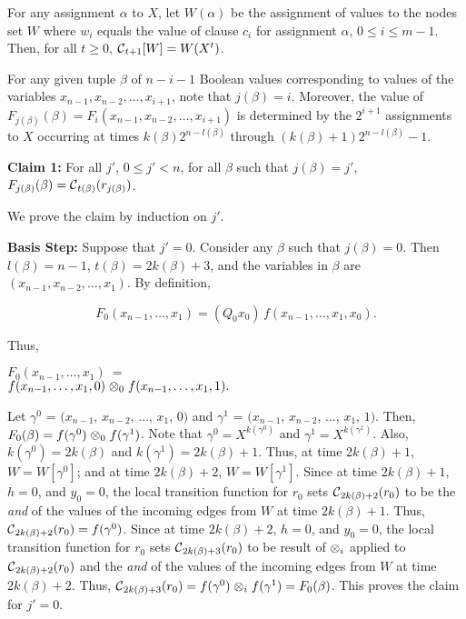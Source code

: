 For any assignment $\alpha$ to $X$, 
let $W(\alpha)$ be the assignment of values to the nodes set $W$ 
where $w_i$ equals the value of clause $c_i$ for assignment $\alpha$, $ 0 \leq i \leq m-1$.
Then,  for all $t \geq 0$, $\mbox{$\mathcal{C}$}_{t+1}[W] = W(X^t)$.

For any given tuple $\beta$ of  $n-i-1$ Boolean values 
corresponding to values of the variables $x_{n-1}, x_{n-2}, \ldots , x_{i+1}$,
note that $j(\beta) = i$.
Moreover, the value of $F_{j(\beta)}(\beta) = F_i(x_{n-1}, x_{n-2}, \ldots , x_{i+1})$
is determined by the $2^{i+1}$ assignments to $X$  occurring at times 
$k(\beta) 2^{n-l(\beta)}$ through $(k(\beta)+1) 2^{n-l(\beta)}-1$.

\smallskip
\noindent
{\bf Claim 1:} For all $j'$, $0 \leq j' < n$,
for all $\beta$ such that $j(\beta) = j'$,
$F_{j(\beta)}(\beta) =\mbox{$\mathcal{C}$}_{t(\beta)}(r_{j(\beta)})$.

\smallskip

\noindent
We prove the claim by induction on $j'$.

\smallskip
\noindent
{\bf Basis Step:} Suppose that $j' = 0$.
Consider any $\beta$ such that $j(\beta) = 0$.
Then $l(\beta) = n-1$, $t(\beta) = 2k(\beta) + 3$,
and the variables in $\beta$ are $(x_{n-1}, x_{n-2}, \ldots , x_1)$.
By definition,

\[F_0(x_{n-1}, \ldots, x_1) 
= (Q_0 x_0) \, f(x_{n-1}, \ldots , x_1, x_0).
\]

Thus,\\ \smallskip

\noindent
$F_0(x_{n-1}, \ldots, x_1) ~=~$ \\
\hspace*{0.1in}
$f(x_{n-1}, \ldots, x_1, 0) \; \mbox{$\otimes$}_0 \; 
f(x_{n-1},  \ldots, x_1, 1).$ \\

\smallskip

\noindent
Let $\gamma^0$ = $(x_{n-1}$, $x_{n-2}$, $\ldots$, $x_1$, $0)$ and
$\gamma^1$ = $(x_{n-1}$, $x_{n-2}$, $\ldots$, $x_1$, $1)$.
Then, $F_0(\beta) =  
f(\gamma^0) \; \mbox{$\otimes$}_0 \; f(\gamma^1)$.
Note that $\gamma^0 = X^{k(\gamma^0)}$ and $\gamma^1 = X^{k(\gamma^1)}$.
Also, $k(\gamma^0) = 2k(\beta)$ and $k(\gamma^1) = 2k(\beta)+1$.
Thus, at time $2k(\beta)+1$, $W = W[\gamma^0]$;
and at time $2k(\beta)+2$, $W = W[\gamma^1]$.
Since at time $2k(\beta)+1$, $h=0$, and $y_0 = 0$, 
the local transition function for $r_0$ sets $\mbox{$\mathcal{C}$}_{2k(\beta)+2}(r_0)$ to be 
the {\em and} of the values of the incoming edges from $W$ at time $2k(\beta)+1$.
Thus, $\mbox{$\mathcal{C}$}_{2k(\beta)+2}(r_0) = f(\gamma^0)$.
Since at time $2k(\beta)+2$, $h=0$, and $y_0 = 0$, 
the local transition function for $r_0$ sets $\mbox{$\mathcal{C}$}_{2k(\beta)+3}(r_0)$ 
to be result of $\mbox{$\otimes$}_i$
applied to $\mbox{$\mathcal{C}$}_{2k(\beta)+2}(r_0)$ and
the {\em and} of the values of the incoming edges from $W$ at time $2k(\beta)+2$.
Thus, $\mbox{$\mathcal{C}$}_{2k(\beta)+3}(r_0) = f(\gamma^0) \; \mbox{$\otimes$}_i \; f(\gamma^1) = F_0(\beta)$.
This proves the claim for $j' = 0$.

